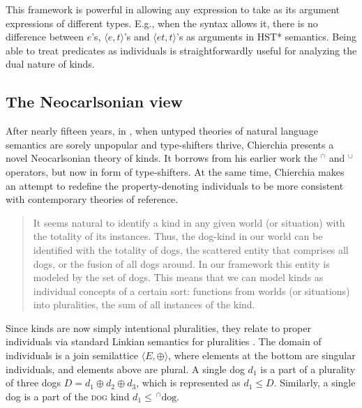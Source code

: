 \documentclass[a4paper, 12pt]{article}
\begin{document}

This framework is powerful in allowing any expression to take as its argument expressions of different types. E.g., when the syntax allows it, there is no difference between $e$'s, $\langle e,t\rangle$'s and $\langle et,t\rangle$'s as arguments in HST* semantics. Being able to treat predicates as individuals is straightforwardly useful for analyzing the dual nature of kinds.

\subsection{The Neocarlsonian view}\label{neocar}

After nearly fifteen years, in \citeyear{chierchia1998referencekindslanguages}, when untyped theories of natural language semantics are sorely unpopular and type-shifters thrive, Chierchia presents a novel Neocarlsonian theory of kinds. It borrows from his earlier work the $^\cap $ and $^\cup $ operators, but now in form of type-shifters. At the same time, Chierchia makes an attempt to redefine the property-denoting individuals to be more consistent with contemporary theories of reference.

\begin{quote}
    It seems natural to identify a kind in any given world (or situation) with the totality of its instances. Thus, the dog-kind in our world can be identified with the totality of dogs, the scattered entity that comprises all dogs, or the fusion of all dogs around. In our framework this entity is modeled by the set of dogs. This means that we can model kinds as individual concepts of a certain sort: functions from worlds (or situations) into pluralities, the sum of all instances of the kind.\hfill\parencite[349]{chierchia1998referencekindslanguages}
\end{quote}

Since kinds are now simply intentional pluralities, they relate to proper individuals via standard Linkian semantics for pluralities \parencite{link1983logicalanalysisplurals}. The domain of individuals is a join semilattice $\langle E,\oplus\rangle$, where elements at the bottom are singular individuals, and elements above are plural. A single dog $d_1$ is a part of a plurality of three dogs $D=d_1\oplus d_2\oplus d_3$, which is represented as $d_1\le D$. Similarly, a single dog is a part of the \textsc{dog} kind $d_1\le\,^\cap \text{dog}$.
\end{document}
